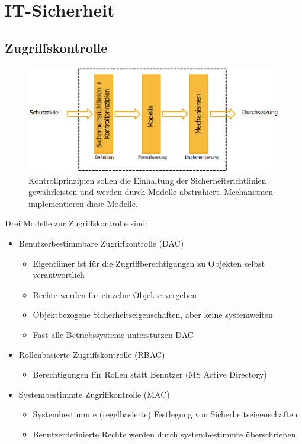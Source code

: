 \documentclass[a4paper,12pt,leqno]{article}
\begin{document}
\section{IT-Sicherheit}

\subsection{Zugriffskontrolle}

\begin{figure}[h!]
\centering
\includegraphics[scale=0.5]{Grafiken/Sicherheitsmodellentwicklung.png}
\caption{Kontrollprinzipien sollen die Einhaltung der Sicherheitsrichtlinien gewährleisten und werden durch Modelle abstrahiert. Mechanismen implementieren diese Modelle.}
\end{figure}
Drei Modelle zur Zugriffskontrolle sind:\\

\begin{itemize}
\item Benutzerbestimmbare Zugriffkontrolle (DAC)
	\begin{itemize}
	\item Eigentümer ist für die Zugriffberechtigungen zu Objekten selbst verantwortlich
	\item Rechte werden für einzelne Objekte vergeben
	\item Objektbezogene Sicherheitseigenschaften, aber keine systemweiten
	\item Fast alle Betriebssysteme unterstützen DAC
	\end{itemize}
\item Rollenbasierte Zugriffskontrolle (RBAC)
	\begin{itemize}
	\item Berechtigungen für Rollen statt Benutzer (MS Active Directory)
	\end{itemize}
\item Systembestimmte Zugriffkontrolle (MAC)
	\begin{itemize}
	\item Systembestimmte (regelbasierte) Festlegung von Sicherheitseigenschaften
	\item Benutzerdefinierte Rechte werden durch systembestimmte überschrieben
	\end{itemize}
\end{itemize}
\end{document}
